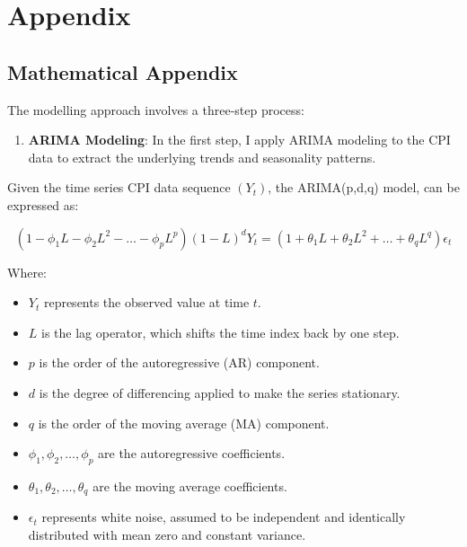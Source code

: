\documentclass[11pt,preprint, authoryear]{elsarticle}
\numberwithin{equation}{section}
\numberwithin{figure}{section}
\numberwithin{table}{section}
\def\tightlist{} %
\begin{document}
\hypertarget{appendix}{%
\section*{Appendix}\label{appendix}}

\hypertarget{mathematical-appendix}{%
\subsection*{\texorpdfstring{Mathematical Appendix
\label{Math}}{Mathematical Appendix }}\label{mathematical-appendix}}

The modelling approach involves a three-step process:

\begin{enumerate}
\def\labelenumi{\arabic{enumi}.}
\tightlist
\item
  \textbf{ARIMA Modeling}: In the first step, I apply ARIMA modeling to
  the CPI data to extract the underlying trends and seasonality
  patterns.
\end{enumerate}

Given the time series CPI data sequence \((Y_t)\), the ARIMA(p,d,q)
model, can be expressed as:

\[
(1 - \phi_1 L - \phi_2 L^2 - \ldots - \phi_p L^p)(1 - L)^d Y_t = (1 + \theta_1 L + \theta_2 L^2 + \ldots + \theta_q L^q) \epsilon_t 
\]

Where:

\begin{itemize}
\tightlist
\item
  \(Y_t\) represents the observed value at time \(t\).
\item
  \(L\) is the lag operator, which shifts the time index back by one
  step.
\item
  \(p\) is the order of the autoregressive (AR) component.
\item
  \(d\) is the degree of differencing applied to make the series
  stationary.
\item
  \(q\) is the order of the moving average (MA) component.
\item
  \(\phi_1, \phi_2, \ldots, \phi_p\) are the autoregressive
  coefficients.
\item
  \(\theta_1, \theta_2, \ldots, \theta_q\) are the moving average
  coefficients.
\item
  \(\epsilon_t\) represents white noise, assumed to be independent and
  identically distributed with mean zero and constant variance.
\end{itemize}
\end{document}
